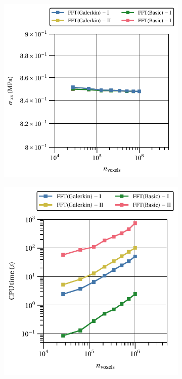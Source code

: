 \begin{figure}[hbt] %
  \centering
	\begin{subfigure}[b]{0.52\textwidth}
    \centering
    \includegraphics[width=\textwidth]{figures/linear_3D_normal_comparison_crit_homo_stress_11_vs_n_voxels}
    \caption{}
    \label{subfig:linear_3D_normal_comparison_crit_homo_stress_11_vs_n_voxels}
  \end{subfigure}
  \begin{subfigure}[b]{0.46\textwidth}
    \centering
    \includegraphics[width=\textwidth]{figures/linear_3D_normal_comparison_crit_cpu_time_vs_n_voxels}

\end{subfigure}
\end{figure}
